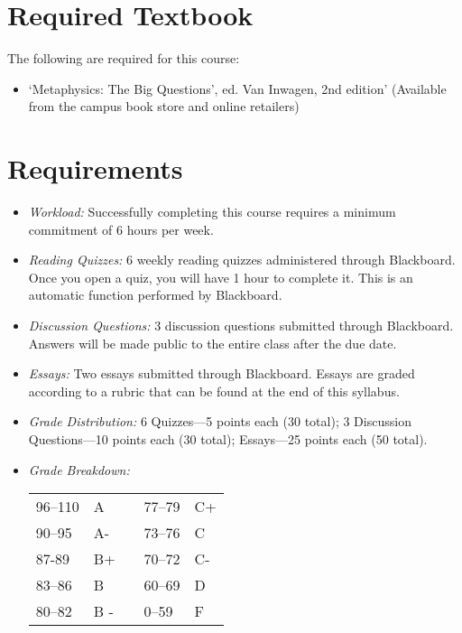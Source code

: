 \documentclass[11pt,article,oneside]{memoir}
\begin{document}
\section{Required Textbook}

The following are required for this course:

\begin{itemize}
\item
 `Metaphysics: The Big Questions', ed. Van Inwagen, 2nd edition' (Available from the campus book store and online retailers)
\end{itemize}

\section{Requirements}

\begin{itemize}
\item \textit{Workload:} Successfully completing this course requires a minimum commitment of 6 hours per week. 

\item \textit{Reading Quizzes:}  6 weekly reading quizzes administered through Blackboard. Once you open a quiz, you will have
1 hour to complete it. This is an automatic function performed
by Blackboard.
\item \textit{Discussion Questions:} 3 discussion questions submitted through Blackboard. Answers will be made public to the entire class after the due date. 

\item \textit{Essays:} Two essays submitted through Blackboard. Essays are graded according to a rubric that can be found at the end of this syllabus. 

\item \textit{Grade Distribution:} 6 Quizzes---5 points each (30 total); 3 Discussion Questions---10 points each (30 total); Essays---25 points each (50 total).

\item \textit{Grade Breakdown:}

 \begin{tabular}{ | l | l | p{2cm} | l | l | }
    \hline 
96--110 & A  & &  77--79 &  C+ \\  
90--95 & A- & &  73--76 & C \\
87-89 & B+ &  &  70--72 & C- \\ 
83--86 & B  & &  60--69 & D\\
80--82 & B - & & 0--59 & F\\ \hline
    \end{tabular}


\end{itemize}
\end{document}

